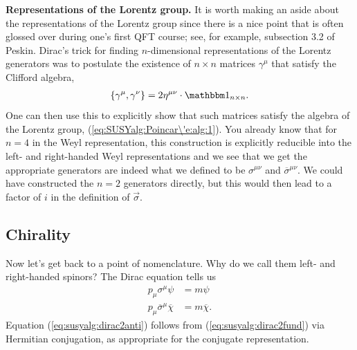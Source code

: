 \documentclass[12pt, oneside]{report}    %
\begin{document}
\begin{example}
    \noindent\textbf{Representations of the Lorentz group.} %
    It is worth making an aside about the representations of the Lorentz group since there is a nice point that is often glossed over during one's first QFT course; see, for example, subsection 3.2 of Peskin\autocite{Peskin:1995ev}. Dirac's trick for finding $n$-dimensional representations of the Lorentz generators was to postulate the existence of $n\times n$ matrices $\gamma^\mu$ that satisfy the Clifford algebra,
    \begin{align}
        \{\gamma^\mu,\gamma^\nu\} = 2\eta^{\mu\nu}\cdot\mathbbm 1_{n\times n}.
    \end{align}
One can then use this to explicitly show that such matrices satisfy the algebra of the Lorentz group,  (\ref{eq:SUSYalg:Poincar\'e:alg:1}). You already know that for $n=4$ in the Weyl representation, this construction is explicitly reducible into the left- and right-handed Weyl representations and we see that we get the appropriate generators are indeed what we defined to be $\sigma^{\mu\nu}$ and $\overline\sigma^{\mu\nu}$. We could have constructed the $n=2$ generators directly, but this would then lead to a factor of $i$ in the definition of $\vec\sigma$. 
\end{example}

\subsection{Chirality}\label{sec:SUSYalg:sec:chirality}

Now let's get back to a point of nomenclature. Why do we call them left- and right-handed spinors? The Dirac equation tells us
\begin{align}
    p_\mu\sigma^\mu \psi &= m \psi\label{eq:susyalg:dirac2fund}\\
    p_\mu\overline\sigma^\mu \overline\chi &= m \overline\chi\label{eq:susyalg:dirac2anti}.
\end{align}
Equation (\ref{eq:susyalg:dirac2anti}) follows from  (\ref{eq:susyalg:dirac2fund}) via Hermitian conjugation, as appropriate for the conjugate representation. 
\end{document}
